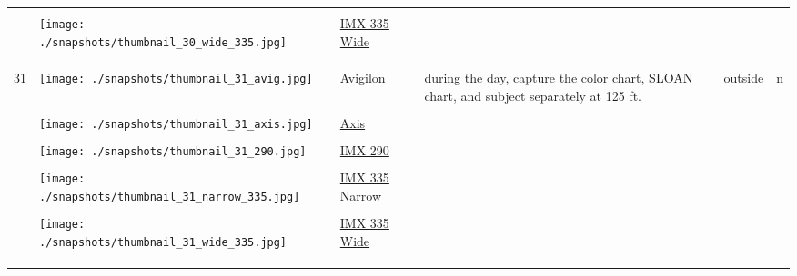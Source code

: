 \documentclass{article}%
\begin{document}
\begin{longtabu}{m{2.5cm} m{4cm} m{2cm} m{4cm} m{2cm} m{2cm}}
&&&&&\\%
&\texttt{[image: ./snapshots/thumbnail\_30\_wide\_335.jpg]}&\href{https://drive.google.com/file/d/1XdX7RYpnXvogVshAxRZs-5iNttBfHa34/view?usp=sharing}{IMX 335 Wide}&&&\\%
&&&&&\\%
&&&&&\\%
\hline%
&&&&&\\%
31&\texttt{[image: ./snapshots/thumbnail\_31\_avig.jpg]}&\href{https://drive.google.com/file/d/11wpP6GZnaFhoZxMhRlveeqczbpdJFu-y/view?usp=sharing}{Avigilon}&during the day, capture the color chart, SLOAN chart, and subject separately at 125 ft.&outside&n\\%
&&&&&\\%
&\texttt{[image: ./snapshots/thumbnail\_31\_axis.jpg]}&\href{https://drive.google.com/file/d/1vZIsQQoGHKXcVQ4B47GvgKPeEuIh-DFQ/view?usp=sharing}{Axis}&&&\\%
&&&&&\\%
&\texttt{[image: ./snapshots/thumbnail\_31\_290.jpg]}&\href{https://drive.google.com/file/d/1hjCuwauieakQcjqrctZkJ0yVbIqzTMUW/view?usp=sharing}{IMX 290}&&&\\%
&&&&&\\%
&\texttt{[image: ./snapshots/thumbnail\_31\_narrow\_335.jpg]}&\href{https://drive.google.com/file/d/1kjleytUtVzIajM25TqLr_-HjFuzjMYd2/view?usp=sharing}{IMX 335 Narrow}&&&\\%
&&&&&\\%
&\texttt{[image: ./snapshots/thumbnail\_31\_wide\_335.jpg]}&\href{https://drive.google.com/file/d/1bJ31niHRfF_ljPbWkuIhYDJQLLWdZdgU/view?usp=sharing}{IMX 335 Wide}&&&\\%
&&&&&\\%
&&&&&\\%
\hline%
&&&&&\\%
\end{longtabu}%
\end{document}
